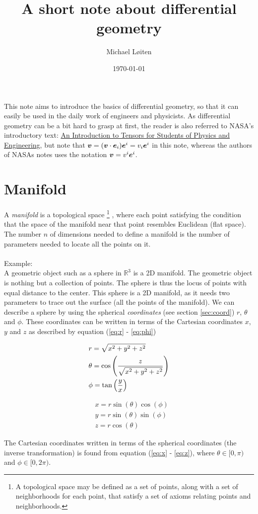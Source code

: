 \documentclass[a4paper, 12pt]{article}
\title{\vspace{-8ex}A short note about differential geometry\vspace{-1ex}}
\author{Michael L{\o}iten}
\date{\vspace{-2ex}\today}
\def\NASAintro{http://www.grc.nasa.gov/WWW/k-12/Numbers/Math/documents/Tensors_TM2002211716.pdf}
\begin{document}
\maketitle

This note aims to introduce the basics of differential geometry, so that it can
easily be used in the daily work of engineers and physicists. As differential
geometry can be a bit hard to grasp at first, the reader is also referred to
NASA's introductory text:
\href{\NASAintro
}{An Introduction to Tensors for Students of Physics and Engineering}, but note 
that $\boldsymbol{v}=(\boldsymbol{v}\cdot\boldsymbol{e}_i)\boldsymbol{e}^i = v_i\boldsymbol{e}^i$ in this note, whereas 
the authors of NASAs notes uses the notation $\boldsymbol{v}=v^i\boldsymbol{e}^i$.


\section{Manifold}
A \emph{manifold} is a topological space%
\footnote{A topological space may be defined as a set of points, along with a
          set of neighborhoods for each point, that satisfy a set of axioms
          relating points and neighborhoods.}%
, where each point satisfying the condition that the space of the manifold near
that point resembles Euclidean (flat space). The number $n$ of dimensions needed
to define a manifold is the number of parameters needed to locate all the points
on it.\\
\\
Example:\\
A geometric object such as a sphere in $\mathbb{R}^3$ is a 2D manifold. The
geometric object is nothing but a collection of points. The sphere is thus the
locus of points with equal distance to the center. This sphere is a 2D
manifold, as it needs two parameters to trace out the surface (all the points of
the manifold). We can describe a sphere by using the spherical
\emph{coordinates} (see section \ref{sec:coord}) $r$, $\theta$ and $\phi$. These
coordinates can be written in terms of the Cartesian coordinates $x$, $y$ and
$z$ as described by equation (\ref{eq:r} - \ref{eq:phi})

\begin{minipage}{0.49\textwidth}
 \begin{align}
 &r = \sqrt{x^2+y^2+z^2} \label{eq:r}\\
 &\theta = \cos\left(\frac{z}{\sqrt{x^2+y^2+z^2}}\right) \label{eq:theta}\\
 &\phi = \tan\left(\frac{y}{x}\right) \label{eq:phi}
 \end{align}
\end{minipage}
\begin{minipage}{0.49\textwidth}
 \begin{align}
 &x = r\sin(\theta)\cos(\phi) \label{eq:x}\\
 &y = r\sin(\theta)\sin(\phi) \label{eq:y}\\
 &z = r\cos(\theta) \label{eq:z}
 \end{align}
\end{minipage}
%
The Cartesian coordinates written in terms of the spherical coordinates (the
inverse transformation) is found from equation (\ref{eq:x} - \ref{eq:z}),
where $\theta \in [0,\pi)$ and $\phi \in [0,2\pi)$.
\end{document}
